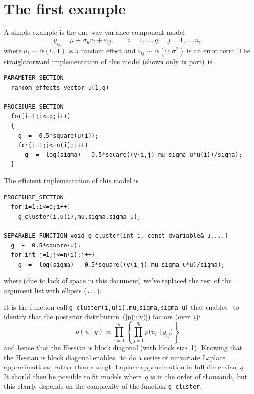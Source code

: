 \documentclass{admbmanual}
\begin{document}
\section{The first example}

A simple example is the one-way variance component model
\[
  y_{ij}=\mu +\sigma_u u_{i}+\varepsilon_{ij},
  \qquad i=1,\ldots ,q,\quad j=1,\ldots ,n_{i}
\]
where $u_{i}\sim N(0,1)$ is a random effect and $\varepsilon_{ij}\sim
N(0,\sigma^2)$ is an error term. The straightforward implementation of this
model (shown only in part)~is
\begin{lstlisting}
PARAMETER_SECTION
  random_effects_vector u(1,q)

PROCEDURE_SECTION
  for(i=1;i<=q;i++)
  {
    g -= -0.5*square(u(i));
    for(j=1;j<=n(i);j++)
      g -= -log(sigma) - 0.5*square((y(i,j)-mu-sigma_u*u(i))/sigma);
  }
\end{lstlisting}
The efficient implementation of this model is
\begin{lstlisting}
PROCEDURE_SECTION
  for(i=1;i<=q;i++)
    g_cluster(i,u(i),mu,sigma,sigma_u);

SEPARABLE_FUNCTION void g_cluster(int i, const dvariable& u,...)
  g -= -0.5*square(u);
  for(int j=1;j<=n(i);j++)
    g -= -log(sigma) - 0.5*square((y(i,j)-mu-sigma_u*u)/sigma);
\end{lstlisting}
where (due to lack of space in this document) we've replaced the rest of the
argument list with ellipsis (\texttt{...}).

It is the function call \texttt{g\_cluster(i,u(i),mu,sigma,sigma\_u)} that
enables \scAR\ to identify that the posterior distribution~(\ref{p(u|y)})
factors (over~$i$):
\[
  p(u \mid y) \propto \prod_{i=1}^{q}
  \left\{ \prod_{j=1}^{n_{i}}p \bigl(u_{i} \mid y_{ij}\bigr)\right\}
\]
and hence that the Hessian is block diagonal (with block size~1). Knowing that
the Hessian is block diagonal enables \scAR\ to do a series of univariate
Laplace approximations, rather than a single Laplace approximation in full
dimension~$q$. It should then be possible to fit models where~$q$ is in the
order of thousands, but this clearly depends on the complexity of the function
\texttt{g\_cluster}.
\end{document}
